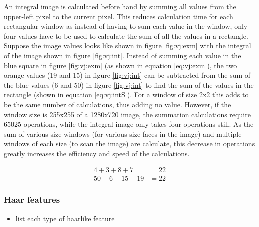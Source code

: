 \documentclass{article}
\begin{document}
An integral image is calculated before hand by summing all values from the upper-left pixel to the current pixel.  This reduces calculation time for each rectangular window as instead of having to sum each value in the window, only four values have to be used to calculate the sum of all the values in a rectangle.  Suppose the image values looks like shown in figure \ref{fig:vj:exm} with the integral of the image shown in figure \ref{fig:vj:int}.  Instead of summing each value in the blue square in figure \ref{fig:vj:exm} (as shown in equation \ref{eq:vj:exm}), the two orange values (19 and 15) in figure \ref{fig:vj:int} can be subtracted from the sum of the blue values (6 and 50) in figure \ref{fig:vj:int} to find the sum of the values in the rectangle (shown in equation \ref{eq:vj:intS}).  For a window of size 2x2 this adds to be the same number of calculations, thus adding no value.  However, if the window size is 255x255 of a 1280x720 image, the summation calculations require 65025 operations, while the integral image only takes four operations still.  As the sum of various size windows (for various size faces in the image) and multiple windows of each size (to scan the image) are calculate, this decrease in operations greatly increases the efficiency and speed of the calculations.

\begin{align}
    4 + 3 + 8 + 7 &= 22 \label{eq:vj:exm}\\
    50 + 6 - 15 - 19 &= 22 \label{eq:vj:intS}
\end{align}

\subsubsection{Haar features}

\begin{itemize}
    \item list each type of haarlike feature
\end{itemize}





\glsaddall
\renewcommand{\arraystretch}{1.5}

\newpage
\printnoidxglossary[type=symbolslist,sort=use,style=symbunitlong,title={Symbols}]
\newpage
\printglossary[type=main]
\newpage
\printglossary[type=\acronymtype]




\end{document}
